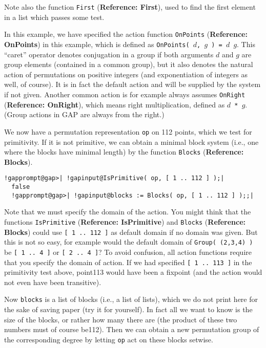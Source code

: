 \documentclass[a4paper,11pt]{report}
\begin{document}
{{ Note also the function \texttt{First} (\textbf{Reference: First}), used to find the first element in a list which passes some test. 

 In this example, we have specified the action function \texttt{OnPoints} (\textbf{Reference: OnPoints}) in this example, which is defined as \texttt{OnPoints( }$d$\texttt{, }$g$\texttt{ ) = }$d$\texttt{ \texttt{} }$g$. This ``caret'' operator denotes conjugation in a group if both arguments $d$ and $g$ are group elements (contained in a common group), but it also denotes the
natural action of permutations on positive integers (and exponentiation of
integers as well, of course). It is in fact the default action and will be
supplied by the system if not given. Another common action is for example
always assumes \texttt{OnRight} (\textbf{Reference: OnRight}), which means right multiplication, defined as $d$\texttt{ * }$g$. (Group actions in \textsf{GAP} are always from the right.) 

 We now have a permutation representation \texttt{op} on 112 points, which we test for primitivity. If it is not primitive, we can
obtain a minimal block system (i.e., one where the blocks have minimal length)
by the function \texttt{Blocks} (\textbf{Reference: Blocks}). 

 
\begin{Verbatim}[commandchars=!@|,fontsize=\small,frame=single,label=Example]
  !gapprompt@gap>| !gapinput@IsPrimitive( op, [ 1 .. 112 ] );|
  false
  !gapprompt@gap>| !gapinput@blocks := Blocks( op, [ 1 .. 112 ] );;|
\end{Verbatim}
 

 Note that we must specify the domain of the action. You might think that the
functions \texttt{IsPrimitive} (\textbf{Reference: IsPrimitive}) and \texttt{Blocks} (\textbf{Reference: Blocks}) could use \texttt{[ 1 .. 112 ]} as default domain if no domain was given. But this is not so easy, for example
would the default domain of \texttt{Group( (2,3,4) )} be \texttt{[ 1 .. 4 ]} or \texttt{[ 2 .. 4 ]}? To avoid confusion, all action functions require that you specify the domain
of action. If we had specified \texttt{[ 1 .. 113 ]} in the primitivity test above, point{\nobreakspace}113 would have been a
fixpoint (and the action would not even have been transitive). 

 Now \texttt{blocks} is a list of blocks (i.e., a list of lists), which we do not print here for
the sake of saving paper (try it for yourself). In fact all we want to know is
the size of the blocks, or rather how many there are (the product of these two
numbers must of course be{\nobreakspace}112). Then we can obtain a new
permutation group of the corresponding degree by letting \texttt{op} act on these blocks setwise. 

}}
\end{document}
